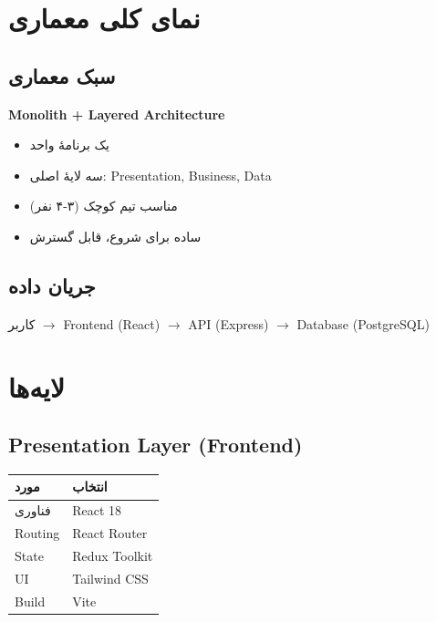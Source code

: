 \documentclass[12pt, a4paper]{article}
\begin{document}
\section{نمای کلی معماری}

\subsection{سبک معماری}
\textbf{Monolith + Layered Architecture}

\begin{itemize}
    \item یک برنامهٔ واحد
    \item سه لایهٔ اصلی: Presentation, Business, Data
    \item مناسب تیم کوچک (۳-۴ نفر)
    \item ساده برای شروع، قابل گسترش
\end{itemize}

\subsection{جریان داده}

\begin{center}
کاربر $\rightarrow$ Frontend (React) $\rightarrow$ API (Express) 
$\rightarrow$ Database (PostgreSQL)
\end{center}

\section{لایه‌ها}

\subsection{Presentation Layer (Frontend)}

\begin{center}
\begin{tabular}{|l|l|}
\hline
\textbf{مورد} & \textbf{انتخاب} \\
\hline
فناوری & React 18 \\
\hline
Routing & React Router \\
\hline
State & Redux Toolkit \\
\hline
UI & Tailwind CSS \\
\hline
Build & Vite \\
\hline
\end{tabular}
\end{center}
\end{document}
